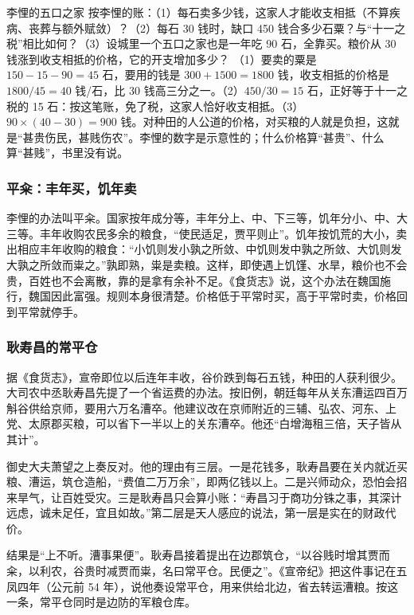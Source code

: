 \begin{example}{李悝的五口之家}\label{ex:qinhan-budget}
按李悝的账：（1）每石卖多少钱，这家人才能收支相抵（不算疾病、丧葬与额外赋敛）？（2）每石 30 钱时，缺口 450 钱合多少石粟？与“十一之税”相比如何？（3）设城里一个五口之家也是一年吃 90 石，全靠买。粮价从 30 钱涨到收支相抵的价格，它的开支增加多少？
\solution （1）要卖的粟是 $150-15-90=45$ 石，要用的钱是 $300+1500=1800$ 钱，收支相抵的价格是 $1800/45=40$ 钱/石，比 30 钱高三分之一。（2）$450/30=15$ 石，正好等于十一之税的 15 石：按这笔账，免了税，这家人恰好收支相抵。（3）$90\times(40-30)=900$ 钱。对种田的人公道的价格，对买粮的人就是负担，这就是“甚贵伤民，甚贱伤农”。李悝的数字是示意性的；什么价格算“甚贵”、什么算“甚贱”，书里没有说。
\end{example}

\subsubsection{平籴：丰年买，饥年卖}
李悝的办法叫平籴。国家按年成分等，丰年分上、中、下三等，饥年分小、中、大三等。丰年收购农民多余的粮食，“使民适足，贾平则止”。饥年按饥荒的大小，卖出相应丰年收购的粮食：“小饥则发小孰之所敛、中饥则发中孰之所敛、大饥则发大孰之所敛而粜之。”孰即熟，粜是卖粮。这样，即使遇上饥馑、水旱，粮价也不会贵，百姓也不会离散，靠的是拿有余补不足。《食货志》说，这个办法在魏国施行，魏国因此富强\cite{hanshu}。规则本身很清楚。价格低于平常时买，高于平常时卖，价格回到平常就停手。

\subsubsection{耿寿昌的常平仓}
据《食货志》，宣帝即位以后连年丰收，谷价跌到每石五钱，种田的人获利很少。大司农中丞耿寿昌先提了一个省运费的办法。按旧例，朝廷每年从关东漕运四百万斛谷供给京师，要用六万名漕卒。他建议改在京师附近的三辅、弘农、河东、上党、太原郡买粮，可以省下一半以上的关东漕卒。他还“白增海租三倍，天子皆从其计”\cite{hanshu}。

御史大夫萧望之上奏反对。他的理由有三层。一是花钱多，耿寿昌要在关内就近买粮、漕运，筑仓造船，“费值二万万余”，即两亿钱以上。二是兴师动众，恐怕会招来旱气，让百姓受灾。三是耿寿昌只会算小账：“寿昌习于商功分铢之事，其深计远虑，诚未足任，宜且如故。”\cite{hanshu}第二层是天人感应的说法，第一层是实在的财政代价。

结果是“上不听。漕事果便”。耿寿昌接着提出在边郡筑仓，“以谷贱时增其贾而籴，以利农，谷贵时减贾而粜，名曰常平仓。民便之”\cite{hanshu}。《宣帝纪》把这件事记在五凤四年（公元前 54 年），说他奏设常平仓，用来供给北边，省去转运漕粮\cite{hanshu}。按这一条，常平仓同时是边防的军粮仓库。

